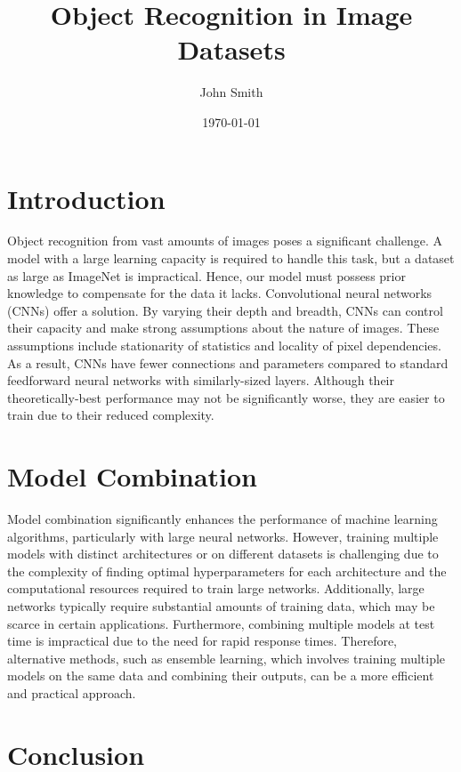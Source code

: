 \documentclass{article}
\title{Object Recognition in Image Datasets}
\author{John Smith}
\date{\today}
\begin{document}
\maketitle

\section{Introduction}

Object recognition from vast amounts of images poses a significant challenge. A model with a large learning capacity is required to handle this task, but a dataset as large as ImageNet is impractical. Hence, our model must possess prior knowledge to compensate for the data it lacks. Convolutional neural networks (CNNs) offer a solution. By varying their depth and breadth, CNNs can control their capacity and make strong assumptions about the nature of images. These assumptions include stationarity of statistics and locality of pixel dependencies. As a result, CNNs have fewer connections and parameters compared to standard feedforward neural networks with similarly-sized layers. Although their theoretically-best performance may not be significantly worse, they are easier to train due to their reduced complexity.

\section{Model Combination}

Model combination significantly enhances the performance of machine learning algorithms, particularly with large neural networks. However, training multiple models with distinct architectures or on different datasets is challenging due to the complexity of finding optimal hyperparameters for each architecture and the computational resources required to train large networks. Additionally, large networks typically require substantial amounts of training data, which may be scarce in certain applications. Furthermore, combining multiple models at test time is impractical due to the need for rapid response times. Therefore, alternative methods, such as ensemble learning, which involves training multiple models on the same data and combining their outputs, can be a more efficient and practical approach.

\section{Conclusion}
\end{document}
